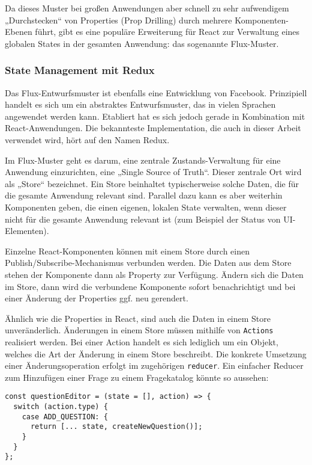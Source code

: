Da dieses Muster bei großen Anwendungen aber schnell zu sehr aufwendigem „Durchstecken“ von Properties (Prop Drilling) durch mehrere Komponenten-Ebenen führt, gibt es eine populäre Erweiterung für React zur Verwaltung eines globalen States in der gesamten Anwendung: das sogenannte Flux-Muster.


\subsubsection{State Management mit Redux}
Das Flux-Entwurfsmuster ist ebenfalls eine Entwicklung von Facebook. Prinzipiell handelt es sich um ein abstraktes Entwurfsmuster, das in vielen Sprachen angewendet werden kann. Etabliert hat es sich jedoch gerade in Kombination mit React-Anwendungen. Die bekannteste Implementation, die auch in dieser Arbeit verwendet wird, hört auf den Namen Redux.

Im Flux-Muster geht es darum, eine zentrale Zustands-Verwaltung für eine Anwendung einzurichten, eine „Single Source of Truth“. Dieser zentrale Ort wird als „Store“ bezeichnet. Ein Store beinhaltet typischerweise solche Daten, die für die gesamte Anwendung relevant sind. Parallel dazu kann es aber weiterhin Komponenten geben, die einen eigenen, lokalen State verwalten, wenn dieser nicht für die gesamte Anwendung relevant ist (zum Beispiel der Status von UI-Elementen).

Einzelne React-Komponenten können mit einem Store durch einen Publish/Subscribe-Mechanismus verbunden werden. Die Daten aus dem Store stehen der Komponente dann als Property zur Verfügung. Ändern sich die Daten im Store, dann wird die verbundene Komponente sofort benachrichtigt und bei einer Änderung der Properties ggf. neu gerendert.

Ähnlich wie die Properties in React, sind auch die Daten in einem Store unveränderlich. Änderungen in einem Store müssen mithilfe von \texttt{Actions} realisiert werden. Bei einer Action handelt es sich lediglich um ein Objekt, welches die Art der Änderung in einem Store beschreibt. Die konkrete Umsetzung einer Änderungsoperation erfolgt im zugehörigen \texttt{reducer}. Ein einfacher Reducer zum Hinzufügen einer Frage zu einem Fragekatalog könnte so aussehen:

\begin{lstlisting}
const questionEditor = (state = [], action) => {
  switch (action.type) {
    case ADD_QUESTION: {
      return [... state, createNewQuestion()];
    }
  }
};

\end{lstlisting}

